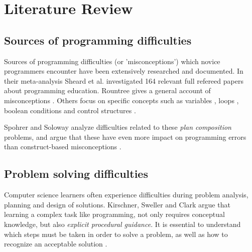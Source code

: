 \section{Literature Review}\label{sec:LitReview}

\subsection{Sources of programming difficulties}

Sources of programming difficulties (or 'misconceptions') which novice
programmers encounter have been extensively researched and documented. In
their meta-analysis Sheard et al. \cite{Sheard2009} investigated 164 relevant
full refereed papers about programming education. Rountree gives a general
account of misconceptions \cite{Rountree2003}. Others focus on specific
concepts such as variables \cite{Kuittinen2004}, loops \cite{Dancik2003},
boolean conditions and control structures \cite{Almstrum1999, Herman2010}.

Spohrer and Soloway analyze difficulties related to these \emph{plan
composition} problems, and argue that these have even more impact on
programming errors than construct-based misconceptions
\cite{spohrer1986novice}.



\subsection{Problem solving difficulties}
Computer science learners often experience difficulties during problem
analysis, planning and design of solutions\cite{Hazzan2011}. Kirschner,
Sweller and Clark argue that learning a complex task like programming, not
only requires conceptual knowledge, but also \emph{explicit procedural
guidance}. It is essential to understand which steps must be taken in order
to solve a problem, as well as how to recognize an acceptable solution
\cite{kirschner2006minimal}.


